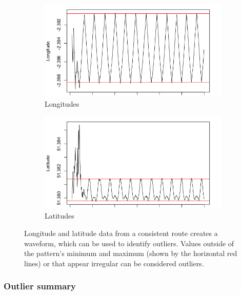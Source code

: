\documentclass[11pt]{report}
\begin{document}
\begin{figure}[!tb]
    \centering
    \begin{minipage}{1\linewidth}
            \begin{subfigure}[t]{.5\linewidth}
                \includegraphics[width=\textwidth]{images/wave_longitudes}
                \caption{Longitudes}
                \label{fig:wave_longitudes}
            \end{subfigure}
            \begin{subfigure}[t]{.5\linewidth}
            	\includegraphics[width=\textwidth]{images/wave_latitudes}
            	\caption{Latitudes}
            	\label{fig:wave_latitudes}
	   \end{subfigure}
        \end{minipage}
    \caption[Longitude and latitude waveforms.]{Longitude and latitude data from a consistent route creates a waveform, which can be used to identify outliers. Values outside of the pattern's minimum and maximum (shown by the horizontal red lines) or that appear irregular can be considered outliers.}
    \label{fig:waves}
\end{figure}

\subsubsection{Outlier summary}
\end{document}
